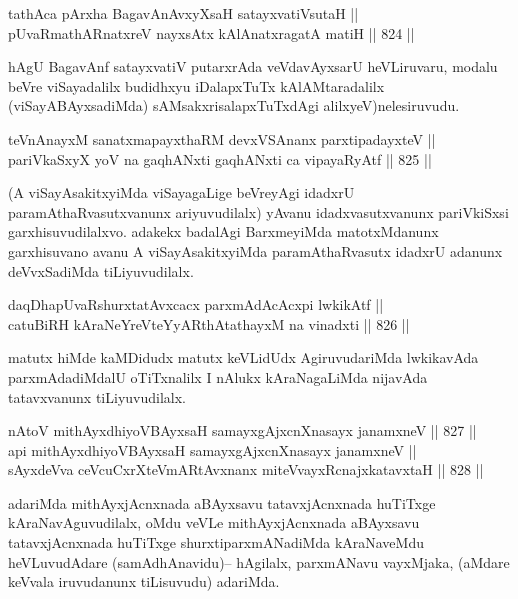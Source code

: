 \begin{shl}
tathAca pArxha BagavAnAvxyXsaH satayxvatiVsutaH || \\
pUvaRmathARnatxreV nayxsAtx kAlAnatxragatA matiH \hfill || 824 ||  
\end{shl}

\begin{artha}
hAgU BagavAnf satayxvatiV putarxrAda veVdavAyxsarU heVLiruvaru, modalu beVre viSayadalilx budidhxyu iDalapxTuTx kAlAMtaradalilx (viSayABAyxsadiMda) sAMsakxrisalapxTuTxdAgi alilxyeV)nelesiruvudu.
\end{artha}

\begin{shl}
teVnAnayxM sanatxmapayxthaRM devxVSAnanx parxtipadayxteV || \\
pariVkaSxyX yoV na gaqhANxti gaqhANxti ca vipayaRyAtf \hfill || 825 ||  
\end{shl}

\begin{artha}
(A viSayAsakitxyiMda viSayagaLige beVreyAgi idadxrU paramAthaRvasutxvanunx ariyuvudilalx) yAvanu idadxvasutxvanunx pariVkiSxsi garxhisuvudilalxvo. adakekx badalAgi BarxmeyiMda matotxMdanunx garxhisuvano avanu A viSayAsakitxyiMda paramAthaRvasutx idadxrU adanunx deVvxSadiMda tiLiyuvudilalx.
\end{artha}

\begin{shl}
daqDhapUvaRshurxtatAvxcacx parxmAdAcAcxpi lwkikAtf || \\
catuBiRH kAraNeYreVteYyARthAtathayxM na vinadxti \hfill || 826 ||  
\end{shl}

\begin{artha}
matutx hiMde kaMDidudx matutx keVLidUdx AgiruvudariMda lwkikavAda parxmAdadiMdalU oTiTxnalilx I nAlukx kAraNagaLiMda nijavAda tatavxvanunx tiLiyuvudilalx.
\end{artha}

\begin{shl}
nAtoV mithAyxdhiyoV\s BAyxsaH samayxgAjxcnXnasayx janamxneV \hfill || 827 ||  \\
api mithAyxdhiyoV\s BAyxsaH samayxgAjxcnXnasayx janamxneV || \\
sAyxdeVva ceVcuCxrXteVmARtAvxnanx miteVvayxRcnajxkatavxtaH \hfill || 828 ||  
\end{shl}

\begin{artha}
adariMda mithAyxjAcnxnada aBAyxsavu tatavxjAcnxnada huTiTxge kAraNavAguvudilalx, oMdu veVLe mithAyxjAcnxnada aBAyxsavu tatavxjAcnxnada huTiTxge shurxtiparxmANadiMda kAraNaveMdu heVLuvudAdare (samAdhAnavidu)-- hAgilalx, parxmANavu vayxMjaka, (aMdare keVvala iruvudanunx tiLisuvudu) adariMda.
\end{artha}

